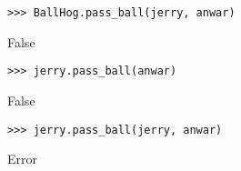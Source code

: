 \begin{lstlisting}
>>> BallHog.pass_ball(jerry, anwar)
\end{lstlisting}
\begin{solution}[.2in]
False
\end{solution}

\begin{lstlisting}
>>> jerry.pass_ball(anwar)
\end{lstlisting}
\begin{solution}[.2in]
False
\end{solution}

\begin{lstlisting}
>>> jerry.pass_ball(jerry, anwar)
\end{lstlisting}
\begin{solution}[.2in]
Error
\end{solution}
